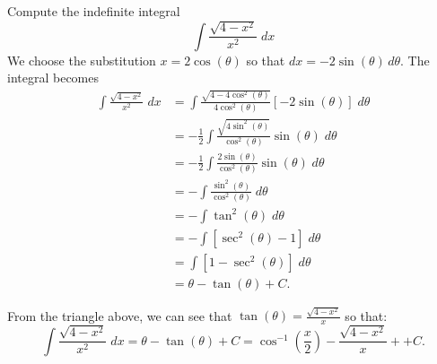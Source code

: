 \documentclass[handout]{ximera}
\begin{document}
\begin{example}[example 2]
Compute the indefinite integral
\[
\int \frac{\sqrt{4-x^2}}{x^2} \; dx
\]
We choose the substitution $x = 2\cos(\theta)$ so that $dx = -2\sin(\theta) \, d\theta$.
The integral becomes
\begin{align*}
\int \frac{\sqrt{4-x^2}}{x^2} \; dx &= \int \frac{\sqrt{4-4\cos^2(\theta)}}{4\cos^2(\theta)} \left[-2\sin(\theta)\right] \; d\theta\\[6pt]
                                  &= -\frac12\int \frac{\sqrt{4\sin^2(\theta)}}{\cos^2(\theta)}  \sin(\theta) \; d\theta\\[6pt]
                                  &= -\frac12\int \frac{2\sin(\theta)}{\cos^2(\theta)}  \sin(\theta) \; d\theta\\[6pt]
 &= -\int \frac{\sin^2(\theta)}{\cos^2(\theta)}  \; d\theta\\[6pt]
 &= -\int \tan^2(\theta)  \; d\theta\\[6pt]
&= -\int \left[\sec^2(\theta) - 1\right] \; d\theta\\[6pt]
&= \int \left[1 - \sec^2(\theta)\right] \; d\theta\\[6pt]
&= \theta-\tan(\theta)  + C.
\end{align*}



\begin{image}
\end{image}




From the triangle above, we can see that $\tan(\theta) = \frac{\sqrt{4-x^2}}{x}$ so that:
\[
\int \frac{\sqrt{4-x^2}}{x^2} \; dx = \theta -\tan(\theta) + C = \cos^{-1}\left(\frac{x}{2}\right) -\frac{\sqrt{4-x^2}}{x} +  + C. 
\]

\end{example}
\end{document}
